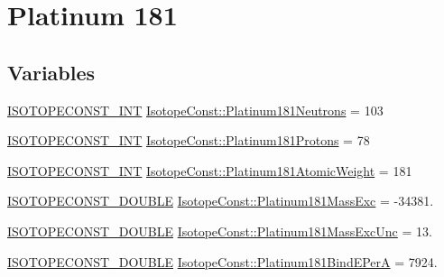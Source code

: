 \hypertarget{group___isotope_const-_platinum-_pt181}{}\section{Platinum 181}
\label{group___isotope_const-_platinum-_pt181}
\subsection*{Variables}
\begin{DoxyCompactItemize}
\item 
\mbox{\hyperlink{group___isotope_const-_macros_ga5f18360b3e99483a35c32d789e62621c}{I\+S\+O\+T\+O\+P\+E\+C\+O\+N\+S\+T\+\_\+\+I\+NT}} \mbox{\hyperlink{group___isotope_const-_platinum-_pt181_ga0d1806afc6616b58adf7fcdbabef2a0f}{Isotope\+Const\+::\+Platinum181\+Neutrons}} = 103
\item 
\mbox{\hyperlink{group___isotope_const-_macros_ga5f18360b3e99483a35c32d789e62621c}{I\+S\+O\+T\+O\+P\+E\+C\+O\+N\+S\+T\+\_\+\+I\+NT}} \mbox{\hyperlink{group___isotope_const-_platinum-_pt181_ga30e24db0ff72d58ebbc9c6cac22b9314}{Isotope\+Const\+::\+Platinum181\+Protons}} = 78
\item 
\mbox{\hyperlink{group___isotope_const-_macros_ga5f18360b3e99483a35c32d789e62621c}{I\+S\+O\+T\+O\+P\+E\+C\+O\+N\+S\+T\+\_\+\+I\+NT}} \mbox{\hyperlink{group___isotope_const-_platinum-_pt181_gac4d3f3bfda5a55eff0d3d22bb19f1670}{Isotope\+Const\+::\+Platinum181\+Atomic\+Weight}} = 181
\item 
\mbox{\hyperlink{group___isotope_const-_macros_ga8f45a7272ce02c0b4c65c44636ed719a}{I\+S\+O\+T\+O\+P\+E\+C\+O\+N\+S\+T\+\_\+\+D\+O\+U\+B\+LE}} \mbox{\hyperlink{group___isotope_const-_platinum-_pt181_gaae9b7925d927ad6222bc2af3ee223567}{Isotope\+Const\+::\+Platinum181\+Mass\+Exc}} = -\/34381.
\item 
\mbox{\hyperlink{group___isotope_const-_macros_ga8f45a7272ce02c0b4c65c44636ed719a}{I\+S\+O\+T\+O\+P\+E\+C\+O\+N\+S\+T\+\_\+\+D\+O\+U\+B\+LE}} \mbox{\hyperlink{group___isotope_const-_platinum-_pt181_gaea16e6db81c0cd417b7e52745fb97af6}{Isotope\+Const\+::\+Platinum181\+Mass\+Exc\+Unc}} = 13.
\item 
\mbox{\hyperlink{group___isotope_const-_macros_ga8f45a7272ce02c0b4c65c44636ed719a}{I\+S\+O\+T\+O\+P\+E\+C\+O\+N\+S\+T\+\_\+\+D\+O\+U\+B\+LE}} \mbox{\hyperlink{group___isotope_const-_platinum-_pt181_ga9dc8816bb27e4807ad04dbfa8d62acaa}{Isotope\+Const\+::\+Platinum181\+Bind\+E\+PerA}} = 7924.
\item 

\end{DoxyCompactItemize}
